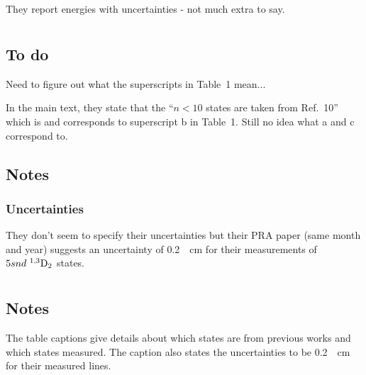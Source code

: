 \documentclass{article}
\newcommand{\tsup}{\textsuperscript}													%
\newcommand{\tsub}{\textsubscript}														%
\newcommand{\SLJ}[3]{\tsup{#1}\textnormal{#2}\tsub{#3}}
\newcommand{\nSLJ}[4]{{#1}\textnormal{ }\SLJ{#2}{#3}{#4}}
\begin{document}
\section{}

They report energies with uncertainties - not much extra to say.

\section{}

\subsection{To do}

Need to figure out what the superscripts in Table~1 mean...

In the main text, they state that the ``${n < 10}$ states are taken from Ref.~10'' which is \cite{moo_1952v2} and corresponds to superscript b in Table~1. Still no idea what a and c correspond to.

\subsection{Notes}

\subsubsection{Uncertainties}

They don't seem to specify their uncertainties but their PRA paper \cite{daz_1995} (same month and year) suggests an uncertainty of \SI{0.2}{\per\cm} for their measurements of $\nSLJ{5snd}{1,3}{D}{2}$ states. 

\section{}

\subsection{Notes}

The table captions give details about which states are from previous works and which states \citeauthor{dai_1995} measured. The caption also states the uncertainties to be \SI{0.2}{\per\cm} for their measured lines.

\printbibliography
\end{document}
